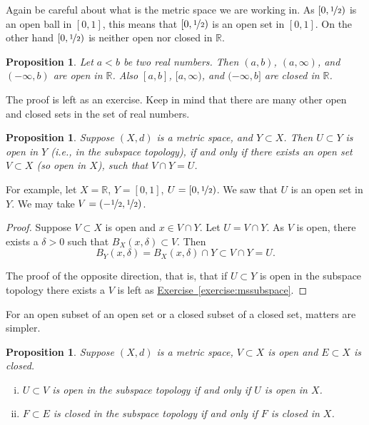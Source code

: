 \documentclass[12pt,openany]{book}
\newcommand{\R}{{\mathbb{R}}}
\theoremstyle{plain}
\newtheorem{prop}[thm]{Proposition}
\theoremstyle{remark}
\theoremstyle{definition}
\theoremstyle{exercise}
\theoremstyle{example}
\newcommand{\exerciseref}[1]{\hyperref[#1]{Exercise~\ref*{#1}}}
\begin{document}
Again be careful about what is the metric space we are working in.
As $[0,\nicefrac{1}{2})$ is
an open ball in $[0,1]$, this means that $[0,\nicefrac{1}{2})$ is
an open set in $[0,1]$.  On the other hand $[0,\nicefrac{1}{2})$
is neither open nor closed in $\R$.

\begin{prop} \label{prop:topology:intervals:openclosed}
Let $a < b$ be two real numbers.  Then $(a,b)$, $(a,\infty)$,
and $(-\infty,b)$ are open in $\R$.
Also $[a,b]$, $[a,\infty)$,
and $(-\infty,b]$ are closed in $\R$.
\end{prop}

The proof is left as an exercise.  Keep in mind that
there are many other open and
closed sets in the set of real numbers. %

\begin{prop} \label{prop:topology:subspaceopen}
Suppose $(X,d)$ is a metric space, and $Y \subset X$.  Then $U \subset Y$
is open in $Y$ (i.e., in the subspace topology), if and only if
there exists an open set $V \subset X$ (so open in $X$), such that
$V \cap Y = U$.
\end{prop}

For example, let $X = \R$, $Y=[0,1]$, $U = [0,\nicefrac{1}{2})$.
We saw that $U$ is an open set in $Y$.
We may take $V = (-\nicefrac{1}{2},\nicefrac{1}{2})$.

\begin{proof}
Suppose $V \subset X$ is open and $x \in V \cap Y$.
Let $U = V \cap Y$.
As $V$ is open, there
exists a $\delta > 0$ such that $B_X(x,\delta) \subset V$.
Then
\begin{equation*}
B_Y(x,\delta) = B_X(x,\delta) \cap Y \subset V \cap Y = U .
\end{equation*}

The proof of the opposite direction, that is, that if $U \subset Y$
is open in the subspace topology there exists a $V$ is left as
\exerciseref{exercise:mssubspace}.
\end{proof}


For an open subset of an open set or a closed subset of a closed
set, matters are simpler.

\begin{prop} \label{prop:topology:subspacesame}
Suppose $(X,d)$ is a metric space, $V \subset X$ is open
and $E \subset X$ is closed.
\begin{enumerate}[(i)]
\item \label{prop:topology:subspacesame:i}
$U \subset V$ is open in the subspace topology if and only if $U$ is open
in $X$.
\item \label{prop:topology:subspacesame:ii}
$F \subset E$ is closed in the subspace topology if and only if $F$ is
closed in $X$.
\end{enumerate}
\end{prop}
\end{document}
